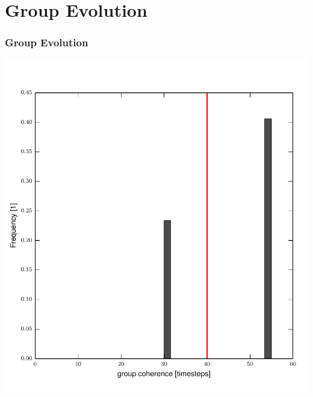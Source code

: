 \documentclass[10pt]{beamer}
\begin{document}
\section{Group Evolution}
\begin{frame}\frametitle{Group Evolution}

    \begin{center}
        \includegraphics[height=0.8\textheight]{src/var_03.pdf}
    \end{center}
    

\end{frame}
\end{document}
